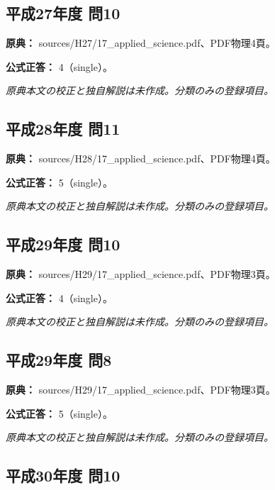 \subsection{平成27年度 問10}
\label{q:h27-reg-applied-10}

\noindent\textbf{原典：} sources/H27/17\_applied\_science.pdf、PDF物理4頁。

\textbf{公式正答：} 4（single）。

\par\textit{原典本文の校正と独自解説は未作成。分類のみの登録項目。}

\subsection{平成28年度 問11}
\label{q:h28-reg-applied-11}

\noindent\textbf{原典：} sources/H28/17\_applied\_science.pdf、PDF物理4頁。

\textbf{公式正答：} 5（single）。

\par\textit{原典本文の校正と独自解説は未作成。分類のみの登録項目。}

\subsection{平成29年度 問10}
\label{q:h29-reg-applied-10}

\noindent\textbf{原典：} sources/H29/17\_applied\_science.pdf、PDF物理3頁。

\textbf{公式正答：} 4（single）。

\par\textit{原典本文の校正と独自解説は未作成。分類のみの登録項目。}

\subsection{平成29年度 問8}
\label{q:h29-reg-applied-08}

\noindent\textbf{原典：} sources/H29/17\_applied\_science.pdf、PDF物理3頁。

\textbf{公式正答：} 5（single）。

\par\textit{原典本文の校正と独自解説は未作成。分類のみの登録項目。}

\subsection{平成30年度 問10}
\label{q:h30-reg-applied-10}

